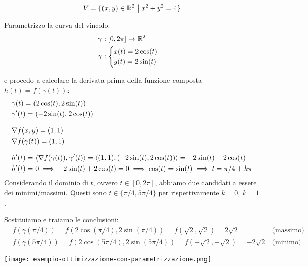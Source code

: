 \[
    V = \{(x,y) \in \mathbb{R}^{2} \;\big|\; x^{2}+y^{2}=4\}
\]

Parametrizzo la curva del vincolo:
\begin{align*}
     & \gamma : [0,2\pi] \to \mathbb{R}^2 \\
     & \gamma : \begin{cases}
                    x(t) = 2\cos(t) \\
                    y(t) = 2\sin(t)
                \end{cases}
\end{align*}

e procedo a calcolare la derivata prima della funzione composta \(h(t) = f(\gamma(t))\):
\begin{align*}
     & \gamma(t) = (2\cos(t), 2\sin(t))                                                                             \\
     & \gamma'(t) = (-2\sin(t), 2\cos(t))                                                                           \\[3mm]
     & \nabla f(x,y) = (1,1)                                                                                        \\
     & \nabla f(\gamma(t)) = (1,1)                                                                                  \\[3mm]
     & h'(t) = \langle\nabla f(\gamma(t)),\gamma'(t)\rangle = \langle(1,1),(-2\sin(t), 2\cos(t))\rangle = -2\sin(t) +2\cos(t) \\
     & h'(t) = 0 \implies -2\sin(t) +2\cos(t) = 0 \implies \cos(t) = \sin(t) \implies t = \pi/4 + k\pi
\end{align*}
Considerando il dominio di \(t\), ovvero \(t \in [0,2\pi]\), abbiamo due candidati a essere dei minimi/massimi.
Questi sono \(t \in \{ \pi/4, 5\pi/4 \} \) per rispettivamente \(k=0\), \(k=1\).

Sostituiamo e traiamo le conclusioni:
\begin{align*}
     & f(\gamma(\pi/4)) = f(2\cos(\pi/4), 2\sin(\pi/4)) = f(\sqrt{2}, \sqrt{2}) = 2\sqrt{2}       & \text{(massimo)} \\
     & f(\gamma(5\pi/4)) = f(2\cos(5\pi/4), 2\sin(5\pi/4)) = f(-\sqrt{2}, -\sqrt{2}) = -2\sqrt{2} & \text{(minimo)}
\end{align*}

\begin{center}
    \texttt{[image: esempio-ottimizzazione-con-parametrizzazione.png]}
\end{center}

